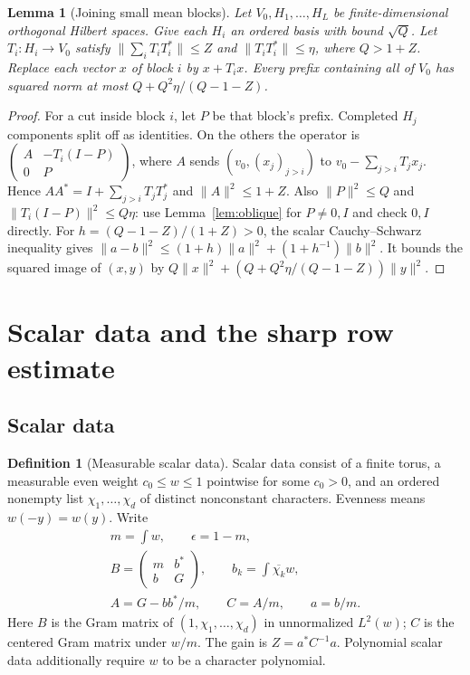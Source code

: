 \documentclass[reqno,a4paper,12pt]{amsart}
\newtheorem{lemma}[theorem]{Lemma}
\theoremstyle{definition}
\newtheorem{definition}[theorem]{Definition}
\begin{document}
\begin{lemma}[Joining small mean blocks]\label{lem:join}
Let $V_0,H_1,\ldots,H_L$ be finite-dimensional orthogonal Hilbert
spaces. Give each $H_i$ an ordered basis with bound $\sqrt Q$.
Let $T_i:H_i\to V_0$ satisfy
$\|\sum_iT_iT_i^*\|\le Z$ and $\|T_iT_i^*\|\le\eta$, where $Q>1+Z$.
Replace each vector $x$ of block $i$ by $x+T_ix$.
Every prefix containing all of $V_0$ has squared norm at most
$Q+Q^2\eta/(Q-1-Z)$.
\end{lemma}
\begin{proof}
For a cut inside block $i$, let $P$ be that block's prefix.
Completed $H_j$ components split off as identities. On the others the
operator is
$\left(\begin{smallmatrix}A&-T_i(I-P)\\0&P\end{smallmatrix}\right)$,
where $A$ sends $(v_0,(x_j)_{j>i})$ to $v_0-\sum_{j>i}T_jx_j$.
Hence $AA^*=I+\sum_{j>i}T_jT_j^*$ and $\|A\|^2\le1+Z$.
Also $\|P\|^2\le Q$ and $\|T_i(I-P)\|^2\le Q\eta$:
use Lemma~\ref{lem:oblique} for $P\ne0,I$ and check $0,I$ directly.
For $h=(Q-1-Z)/(1+Z)>0$, the scalar Cauchy--Schwarz inequality gives
$\|a-b\|^2\le(1+h)\|a\|^2+(1+h^{-1})\|b\|^2$.
It bounds the squared image of $(x,y)$ by
$Q\|x\|^2+(Q+Q^2\eta/(Q-1-Z))\|y\|^2$.
\end{proof}

\section{Scalar data and the sharp row estimate}
\subsection{Scalar data}
\begin{definition}[Measurable scalar data]\label{def:scalar}
Scalar data consist of a finite torus, a measurable even weight
$c_0\le w\le1$ pointwise for some $c_0>0$, and an ordered nonempty
list $\chi_1,\ldots,\chi_d$ of distinct nonconstant characters.
Evenness means $w(-y)=w(y)$. Write
\[
 \begin{gathered}
 m=\int w,\qquad\epsilon=1-m,\\
 B=\begin{pmatrix}m&b^*\\b&G\end{pmatrix},\qquad
 b_k=\int\overline{\chi_k}w,\\
 A=G-bb^*/m,\qquad C=A/m,\qquad a=b/m.
 \end{gathered}
\]
Here $B$ is the Gram matrix of $(1,\chi_1,\ldots,\chi_d)$ in
unnormalized $L^2(w)$; $C$ is the centered Gram matrix under $w/m$.
The gain is $Z=a^*C^{-1}a$.
Polynomial scalar data additionally require $w$ to be a character polynomial.
\end{definition}
\end{document}

